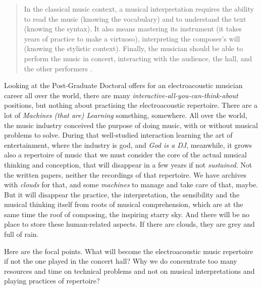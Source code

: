 \documentclass[twoside,a4paper]{article}
\begin{document}
\begin{quote}
In the classical music context, a musical interpretation requires the ability to read the music (knowing the vocabulary) and to understand the text (knowing the syntax). It also means mastering its instrument (it takes years of practice to make a virtuoso), interpreting the composer’s will (knowing the stylistic context). Finally, the musician should be able to perform the music in concert, interacting with the audience, the hall, and the other performers \cite{lem16}.
\end{quote}

Looking at the Post-Graduate Doctoral offers for an electroacoustic musician career all over the world, there are many \emph{interactive-all-you-can-think-about} positions, but nothing about practising the electroacoustic repertoire. There are a lot of \emph{Machines (that are) Learning} something, somewhere. All over the world, the music industry conceived the purpose of doing music, with or without musical problems to solve. During that well-studied interaction learning the art of entertainment, where the industry is god, and \emph{God is a DJ}, meanwhile, it grows also a repertoire of music that we must consider the core of the actual musical thinking and conception, that will disappear in a few years if not \emph{sustained}. Not the written papers, neither the recordings of that repertoire. We have archives with \emph{clouds} for that, and some \emph{machines} to manage and take care of that, maybe. But it will disappear the practice, the interpretation, the sensibility and the musical thinking itself from roots of musical comprehension, which are at the same time the roof of composing, the inspiring starry sky.  And there will be no place to store these human-related aspects. If there are clouds, they are grey and full of rain.

Here are the focal points. What will become the electroacoustic music repertoire if not the one played in the concert hall? Why we do concentrate too many resources and time on technical problems and not on musical interpretations and playing practices of repertoire?

\end{document}
